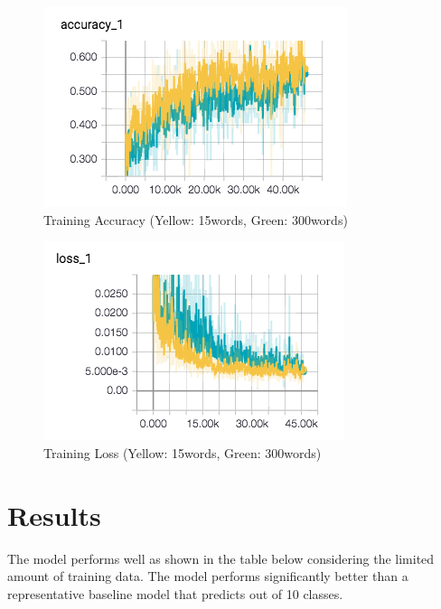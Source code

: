 \documentclass[11pt]{article}
\begin{document}
\begin{figure}
  \includegraphics[width=\linewidth]{accuracy.png}
  \caption{Training Accuracy (Yellow: 15words, Green: 300words)}
  \label{fig:accuracy}
\end{figure}

\begin{figure}
  \includegraphics[width=\linewidth]{loss.png}
  \caption{Training Loss (Yellow: 15words, Green: 300words)}
  \label{fig:loss}
\end{figure}

\section{Results}
The model performs well as shown in the table below considering the 
limited amount of training data. The model performs significantly better 
than a representative baseline model that predicts out of 10 classes.
\end{document}
